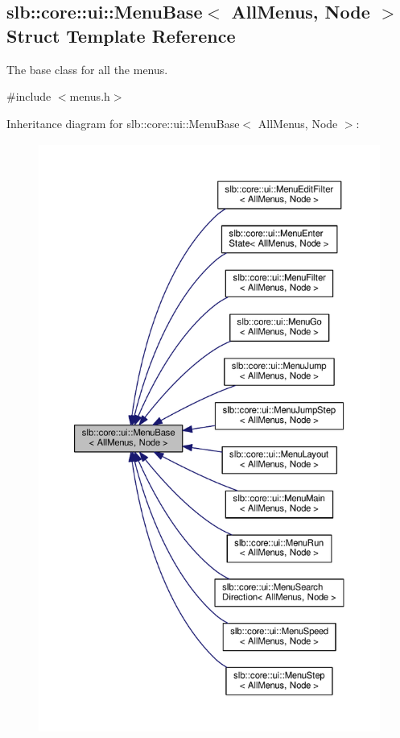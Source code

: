 \hypertarget{structslb_1_1core_1_1ui_1_1MenuBase}{}\subsection{slb\+:\+:core\+:\+:ui\+:\+:Menu\+Base$<$ All\+Menus, Node $>$ Struct Template Reference}
\label{structslb_1_1core_1_1ui_1_1MenuBase}


The base class for all the menus.  




{\ttfamily \#include $<$menus.\+h$>$}



Inheritance diagram for slb\+:\+:core\+:\+:ui\+:\+:Menu\+Base$<$ All\+Menus, Node $>$\+:\nopagebreak
\begin{figure}[H]
\begin{center}
\leavevmode
\includegraphics[height=550pt]{structslb_1_1core_1_1ui_1_1MenuBase__inherit__graph}
\end{center}
\end{figure}


